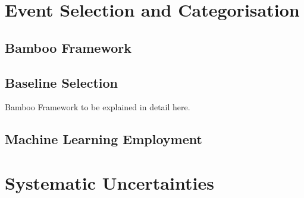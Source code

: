 \section{Event Selection and Categorisation}

\subsection{Bamboo Framework}

\subsection{Baseline Selection}

Bamboo Framework to be explained in detail here.

\subsection{Machine Learning Employment}

\section{Systematic Uncertainties}

